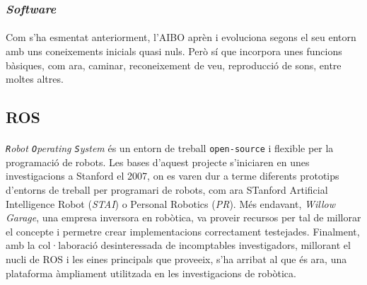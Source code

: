 \documentclass[12pt,a4paper,final,twoside]{article}
\begin{document}


\label{Software}
\subsubsection{\textit{Software}}
\paragraph{}Com s'ha esmentat anteriorment, l'AIBO aprèn i evoluciona segons el seu entorn amb uns coneixements inicials quasi nuls. Però sí que incorpora unes funcions bàsiques, com ara, caminar, reconeixement de veu, reproducció de sons, entre moltes altres.


  


\subsection{ROS}
\label{ROS}
\paragraph{}\textit{\texttt{R}obot \texttt{O}perating \texttt{S}ystem} \cite{ROS} és un entorn de treball \texttt{open-source} i flexible per la programació de robots. Les bases d'aquest projecte s'iniciaren en unes investigacions a Stanford el 2007, on es varen dur a terme diferents prototips d'entorns de treball per programari de robots, com ara STanford Artificial Intelligence Robot (\textit{STAI}) o Personal Robotics (\textit{PR}). Més endavant, \textit{Willow Garage}, una empresa inversora en robòtica, va proveir recursos per tal de millorar el concepte i permetre crear implementacions correctament testejades. Finalment, amb la col·laboració desinteressada de incomptables investigadors, millorant el nucli de ROS i les eines principals que proveeix, s'ha arribat al que és ara, una plataforma àmpliament utilitzada en les investigacions de robòtica.
\end{document}
